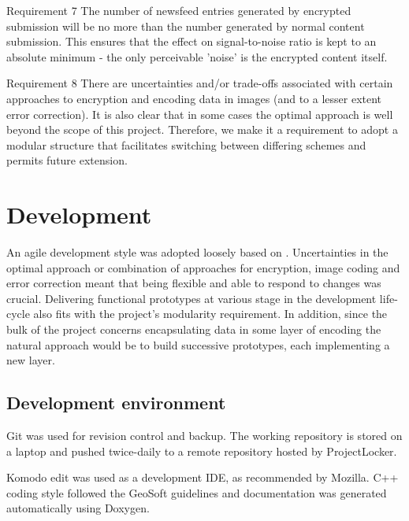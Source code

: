 \begin{desc}
    \item[Requirement 7] The number of newsfeed entries generated by encrypted submission will be no more than the number generated by normal content submission. This ensures that the effect on signal-to-noise ratio is kept to an absolute minimum - the only perceivable 'noise' is the encrypted content itself.
    

    \item[Requirement 8] There are uncertainties and/or trade-offs associated with certain approaches to encryption and encoding data in images (and to a lesser extent error correction). It is also clear that in some cases the optimal approach is well beyond the scope of this project. Therefore, we make it a requirement to adopt a modular structure that facilitates switching between differing schemes and permits future extension.
    
\end{desc}


   
\FloatBarrier 
\section{Development}
        
An agile development style was adopted loosely based on \cite{agile}. Uncertainties in the optimal approach or combination of approaches for encryption, image coding and error correction meant that being flexible and able to respond to changes was crucial. Delivering functional prototypes at various stage in the development life-cycle also fits with the project's modularity requirement. In addition, since the bulk of the project concerns encapsulating data in some layer of encoding the natural approach would be to build successive prototypes, each implementing a new layer.

\subsection{Development environment}

Git was used for revision control and backup. The working repository is stored on a laptop and pushed twice-daily to a remote repository hosted by ProjectLocker.

Komodo edit was used as a development IDE, as recommended by Mozilla. C++ coding style followed the GeoSoft guidelines \cite{code-style} and documentation was generated automatically using Doxygen.

